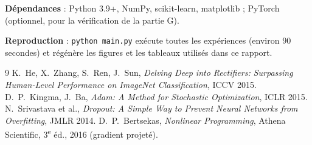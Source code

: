 \documentclass[11pt,a4paper]{article}
\begin{document}
\textbf{Dépendances} : Python 3.9+, NumPy, scikit-learn, matplotlib ; PyTorch (optionnel, pour la vérification de la partie G).

\textbf{Reproduction} : \texttt{python main.py} exécute toutes les expériences (environ 90 secondes) et régénère les figures et les tableaux utilisés dans ce rapport.

\begin{thebibliography}{9}
 K.~He, X.~Zhang, S.~Ren, J.~Sun, \emph{Delving Deep into Rectifiers: Surpassing Human-Level Performance on ImageNet Classification}, ICCV 2015.
 D.~P.~Kingma, J.~Ba, \emph{Adam: A Method for Stochastic Optimization}, ICLR 2015.
 N.~Srivastava et al., \emph{Dropout: A Simple Way to Prevent Neural Networks from Overfitting}, JMLR 2014.
 D.~P.~Bertsekas, \emph{Nonlinear Programming}, Athena Scientific, 3\textsuperscript{e} éd., 2016 (gradient projeté).
\end{thebibliography}
\end{document}
